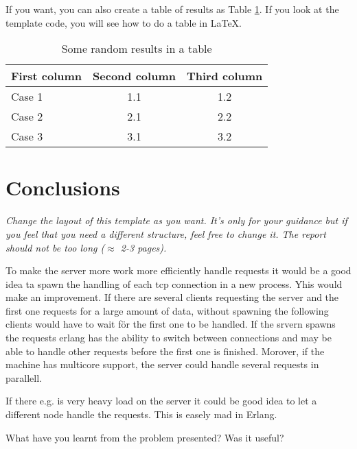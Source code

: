 \documentclass[a4paper, 11pt]{article}
\begin{document}
If you want, you can also create a table of results as Table
\ref{tab:results}. If you look at the template code, you will see how
to do a table in \LaTeX.

\begin{table}[h]
\centering
\begin{tabular}{lcc}
First column & Second column & Third column\\\hline
Case 1 & 1.1 & 1.2\\\hline
Case 2 & 2.1 & 2.2\\\hline
Case 3 & 3.1 & 3.2\\\hline
\end{tabular}
\caption{Some random results in a table}
\label{tab:results}
\end{table}

\section{Conclusions}



\textit{Change the layout of this template as you want. It's only for
  your guidance but if you feel that you need a different structure,
  feel free to change it. The report should not be too long ($\approx$
  2-3 pages).}

To make the server more work more efficiently handle requests it would be a good idea ta spawn the handling of each tcp connection in a new process.
Yhis would make an improvement.
If there are several clients requesting the server and the first one requests for a large amount of data, without spawning the following clients would have to wait för the first one to be handled. 
If the srvern spawns the requests erlang has the ability to switch between connections and may be able to handle other requests before the first one is finished.
Morover, if the machine has multicore support, the server could handle several requests in parallell.

If there e.g. is very heavy load on the server it could be good idea to let a different node handle the requests.
This is easely mad in Erlang.


What have you learnt from the problem presented?
Was it useful?
\end{document}
